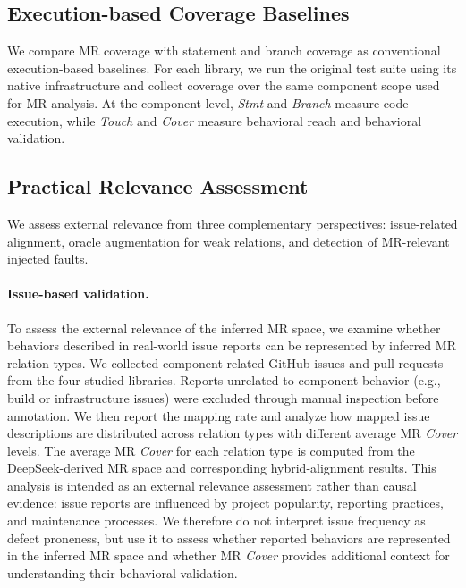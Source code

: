 \subsection{Execution-based Coverage Baselines}\label{sec:baselines}
We compare MR coverage with statement and branch coverage as conventional execution-based baselines. For each library, we run the original test suite using its native infrastructure and collect coverage over the same component scope used for MR analysis. At the component level, \textit{Stmt} and \textit{Branch} measure code execution, while \textit{Touch} and \textit{Cover} measure behavioral reach and behavioral validation.

\subsection{Practical Relevance Assessment}\label{sec:external-validation}
We assess external relevance from three complementary perspectives: issue-related alignment, oracle augmentation for weak relations, and detection of MR-relevant injected faults.

\paragraph{Issue-based validation.} To assess the external relevance of the inferred MR space, we examine whether behaviors described in real-world issue reports can be represented by inferred MR relation types. We collected component-related GitHub issues and pull requests from the four studied libraries. Reports unrelated to component behavior (e.g., build or infrastructure issues) were excluded through manual inspection before annotation. We then report the mapping rate and analyze how mapped issue descriptions are distributed across relation types with different average MR \textit{Cover} levels. The average MR \textit{Cover} for each relation type is computed from the DeepSeek-derived MR space and corresponding hybrid-alignment results. This analysis is intended as an external relevance assessment rather than causal evidence: issue reports are influenced by project popularity, reporting practices, and maintenance processes. We therefore do not interpret issue frequency as defect proneness, but use it to assess whether reported behaviors are represented in the inferred MR space and whether MR \textit{Cover} provides additional context for understanding their behavioral validation.

